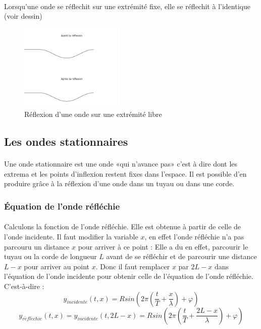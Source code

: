 \documentclass[a4paper]{article}
\begin{document}
\paragraph{}Lorsqu'une onde se réflechit sur une extrémité fixe, elle se réflechit à l'identique (voir dessin)
\begin{figure}
\begin{center}
\includegraphics[width=5cm]{imgs/refllibre.png}
\end{center}
\caption{Réflexion d'une onde sur une extrémité libre}
\label{Réflexion d'une onde sur une extrémité libre}
\end{figure}
\subsection{Les ondes stationnaires}
\paragraph{}Une onde stationnaire est une onde «qui n'avance pas» c'est à dire dont les extrema et les points d'inflexion restent fixes dans l'espace. Il est possible d'en produire grâce à la réflexion d'une onde dans un tuyau ou dans une corde.
\subsubsection{Équation de l'onde réfléchie}
\paragraph{}Calculons la fonction de l'onde réfléchie. Elle est obtenue à partir de celle de l'onde incidente. Il faut modifier la variable $x$, en effet l'onde réfléchie n'a pas parcouru un distance $x$ pour arriver à ce point : Elle a du en effet, parcourir le tuyau ou la corde de longueur $L$ avant de se réfléchir et de parcourir une distance $L-x$ pour arriver au point $x$. Donc il faut remplacer $x$ par $2L-x$ dans l'équation de l'onde incidente pour obtenir celle de l'équation de l'onde réfléchie. C'est-à-dire :  
\[y_{incidente}(t,x)=Rsin\left(2\pi \left(\frac{t}{T}+\frac{x}{\lambda}\right)+\varphi\right)\]
\[y_{r\acute{e}fl\acute{e}chie}(t,x)=y_{incidente}(t,2L-x)=Rsin\left(2\pi \left(\frac{t}{T}+\frac{2L-x}{\lambda}\right)+\varphi\right)\]
\end{document}

